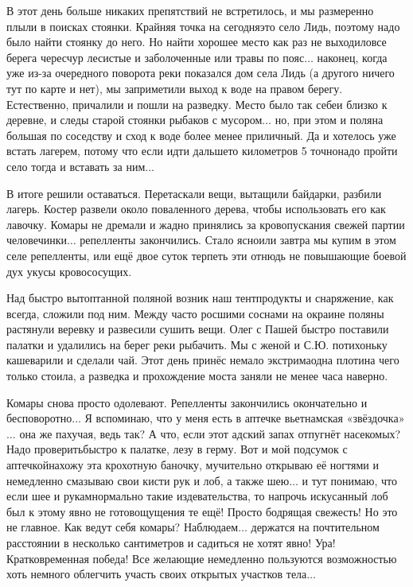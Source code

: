 В этот день больше никаких препятствий не встретилось, и мы размеренно плыли в поисках стоянки. Крайняя точка на сегодня\mdash это село Лидь, поэтому надо было найти стоянку до него. Но найти хорошее место как раз не выходило\mdash все берега чересчур лесистые и заболоченные или травы по пояс$\ldots$ наконец, когда уже из-за очередного поворота реки показался дом села Лидь (а другого ничего тут по карте и нет), мы заприметили выход к воде на правом берегу. Естественно, причалили и пошли на разведку. Место было так себе\mdash и близко к деревне, и следы старой стоянки рыбаков с мусором$\ldots$ но, при этом и поляна большая по соседству и сход к воде более менее приличный. Да и хотелось уже встать лагерем, потому что если идти дальше\mdash то километров 5 точно\mdash надо пройти село тогда и вставать за ним$\ldots$

В итоге решили оставаться. Перетаскали вещи, вытащили байдарки, разбили лагерь. Костер развели около поваленного дерева, чтобы использовать его как лавочку. Комары не дремали и жадно принялись за кровопускания свежей партии человечинки$\ldots$ репелленты закончились. Стало ясно\mdash или завтра мы купим в этом селе репелленты, или ещё двое суток терпеть эти отнюдь не повышающие боевой дух укусы кровососущих.

Над быстро вытоптанной поляной возник наш тент\mdash продукты и снаряжение, как всегда, сложили под ним. Между часто росшими соснами на окраине поляны растянули веревку и развесили сушить вещи. Олег с Пашей быстро поставили палатки и удалились на берег реки рыбачить. Мы с женой и С.Ю. потихоньку кашеварили и сделали чай. Этот день принёс немало экстрима\mdash одна плотина чего только стоила, а разведка и прохождение моста заняли не менее часа наверно. 

Комары снова просто одолевают. Репелленты закончились окончательно и бесповоротно$\ldots$ Я вспоминаю, что у меня есть в аптечке вьетнамская «звёздочка»$\ldots$ она же пахучая, ведь так? А что, если этот адский запах отпугнёт насекомых? Надо проверить\mdash быстро к палатке, лезу в герму. Вот и мой подсумок с аптечкой\mdash нахожу эта крохотную баночку, мучительно открываю её ногтями и немедленно смазываю свои кисти рук и лоб, а также шею$\ldots$ и тут понимаю, что если шее и рукам\mdash нормально такие издевательства, то напрочь искусанный лоб был к этому явно не готов\mdash ощущения те ещё! Просто бодрящая свежесть! Но это не главное. Как ведут себя комары? Наблюдаем$\ldots$ держатся на почтительном расстоянии в несколько сантиметров и садиться не хотят явно! Ура! Кратковременная победа! Все желающие немедленно пользуются возможностью хоть немного облегчить участь своих открытых участков тела$\ldots$

